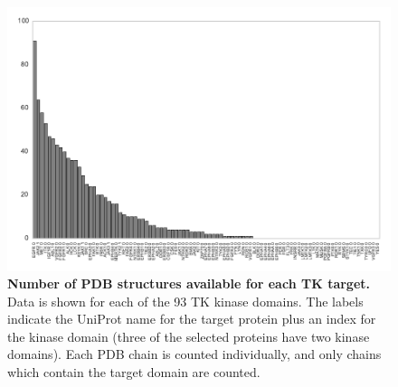 \documentclass[aps,pre,twocolumn,nofootinbib,superscriptaddress,linenumbers]{revtex4-1}
\begin{document}
\begin{figure}[tbp]
    \includegraphics[width=\textwidth]{nstructures_per_tk_target/nstructures_per_tk_target.pdf}
    \caption{{\bf Number of PDB structures available for each TK target.}
    \color{red}
    Data is shown for each of the 93 TK kinase domains. The labels indicate the UniProt name for the target protein plus an index for the kinase domain (three of the selected proteins have two kinase domains). Each PDB chain is counted individually, and only chains which contain the target domain are counted.
}
    \label{figure:nstructures-per-tk-target}
\end{figure}
\end{document}
